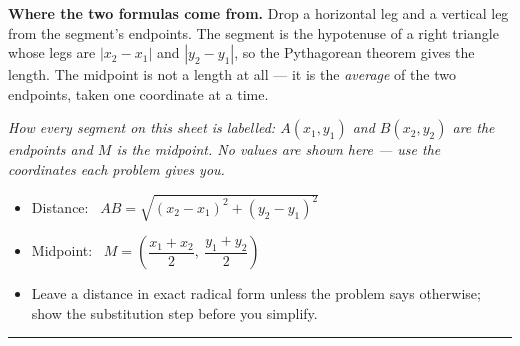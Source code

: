 \documentclass[12pt]{article}
\begin{document}

\noindent\textbf{Where the two formulas come from.} Drop a horizontal leg and a vertical
leg from the segment's endpoints. The segment is the hypotenuse of a right triangle whose
legs are $|x_2 - x_1|$ and $|y_2 - y_1|$, so the Pythagorean theorem gives the length. The
midpoint is not a length at all --- it is the \emph{average} of the two endpoints, taken one
coordinate at a time.

\begin{center}
\end{center}

\noindent\small\textit{How every segment on this sheet is labelled: $A(x_1, y_1)$ and
$B(x_2, y_2)$ are the endpoints and $M$ is the midpoint. No values are shown here --- use
the coordinates each problem gives you.}\normalsize

\begin{itemize}[leftmargin=0.9cm, itemsep=1pt, topsep=3pt]
  \item Distance: \ $AB = \sqrt{(x_2 - x_1)^2 + (y_2 - y_1)^2}$
  \item Midpoint: \ $M = \left( \dfrac{x_1 + x_2}{2},\ \dfrac{y_1 + y_2}{2} \right)$
  \item Leave a distance in exact radical form unless the problem says otherwise; show the
        substitution step before you simplify.
\end{itemize}
\noindent\rule{\linewidth}{0.4pt}


\end{document}
